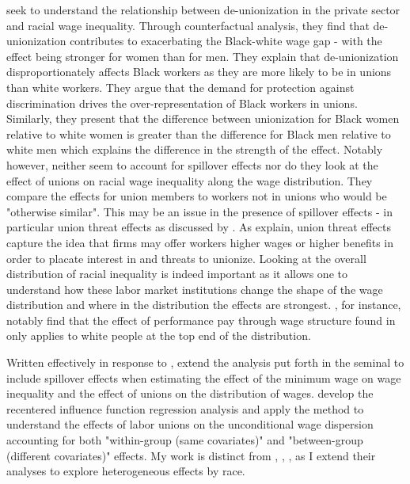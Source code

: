 \documentclass[11pt]{article}
\begin{document}
\citet{rosenfeldkleykamp2012} seek to understand the relationship between de-unionization in the private sector and racial wage inequality. Through counterfactual analysis, they find that de-unionization contributes to exacerbating the Black-white wage gap - with the effect being stronger for women than for men. They explain that de-unionization disproportionately affects Black workers as they are more likely to be in unions than white workers. They argue that the demand for protection against discrimination drives the over-representation of Black workers in unions. Similarly, they present that the difference between unionization for Black women relative to white women is greater than the difference for Black men relative to white men which explains the difference in the strength of the effect. Notably however, \citet{rosenfeldkleykamp2012} neither seem to account for spillover effects nor do they look at the effect of unions on racial wage inequality along the wage distribution. They compare the effects for union members to workers not in unions who would be "otherwise similar". This may be an issue in the presence of spillover effects - in particular union threat effects as discussed by \citet{fll2021}. As \citet{fll2021} explain, union threat effects capture the idea that firms may offer workers higher wages or higher benefits in order to placate interest in and threats to unionize. Looking at the overall distribution of racial inequality is indeed important as it allows one to understand how these labor market institutions change the shape of the wage distribution and where in the distribution the effects are strongest. \citet{heywoodparent2012}, for instance, notably find that the effect of performance pay through wage structure found in \citet{lmp2009} only applies to white people at the top end of the distribution.

Written effectively in response to \citet{ams2016}, \citet{fll2021} extend the analysis put forth in the seminal \citet{dfl1996} to include spillover effects when estimating the effect of the minimum wage on wage inequality and the effect of unions on the distribution of wages. \citet{ffl2009} develop the recentered influence function regression analysis and apply the method to understand the effects of labor unions on the unconditional wage dispersion accounting for both "within-group (same covariates)" and "between-group (different covariates)" effects. My work is distinct from \citet{fll2021}, \citet{ams2016}, \citet{ffl2009}, \citet{dfl1996} as I extend their analyses to explore heterogeneous effects by race. 
\end{document}
